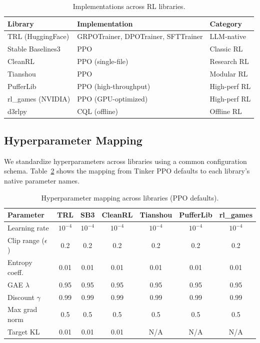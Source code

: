 \documentclass{article}  \usepackage[preprint,nonatbib]{neurips_2026} \usepackage[numbers]{natbib}
\begin{document}
\begin{table}[htbp]
\centering
\caption{Implementations across RL libraries.}
\label{tab:implementations}
\begin{tabular}{lll}
\toprule
\textbf{Library} & \textbf{Implementation} & \textbf{Category} \\
\midrule
TRL (HuggingFace) & GRPOTrainer, DPOTrainer, SFTTrainer & LLM-native \\
Stable Baselines3 & PPO & Classic RL \\
CleanRL & PPO (single-file) & Research RL \\
Tianshou & PPO & Modular RL \\
PufferLib & PPO (high-throughput) & High-perf RL \\
rl\_games (NVIDIA) & PPO (GPU-optimized) & High-perf RL \\
d3rlpy & CQL (offline) & Offline RL \\
\bottomrule
\end{tabular}
\end{table}

\subsection{Hyperparameter Mapping}

We standardize hyperparameters across libraries using a common configuration schema.
Table~\ref{tab:hyperparams} shows the mapping from Tinker PPO defaults to each library's
native parameter names.

\begin{table}[htbp]
\centering
\caption{Hyperparameter mapping across libraries (PPO defaults).}
\label{tab:hyperparams}
\begin{tabular}{lcccccc}
\toprule
\textbf{Parameter} & \textbf{TRL} & \textbf{SB3} & \textbf{CleanRL} & \textbf{Tianshou} & \textbf{PufferLib} & \textbf{rl\_games} \\
\midrule
Learning rate & $10^{-4}$ & $10^{-4}$ & $10^{-4}$ & $10^{-4}$ & $10^{-4}$ & $10^{-4}$ \\
Clip range ($\epsilon$) & 0.2 & 0.2 & 0.2 & 0.2 & 0.2 & 0.2 \\
Entropy coeff. & 0.01 & 0.01 & 0.01 & 0.01 & 0.01 & 0.01 \\
GAE $\lambda$ & 0.95 & 0.95 & 0.95 & 0.95 & 0.95 & 0.95 \\
Discount $\gamma$ & 0.99 & 0.99 & 0.99 & 0.99 & 0.99 & 0.99 \\
Max grad norm & 0.5 & 0.5 & 0.5 & 0.5 & 0.5 & 0.5 \\
Target KL & 0.01 & 0.01 & 0.01 & N/A & N/A & N/A \\
\bottomrule
\end{tabular}
\end{table}
\end{document}
